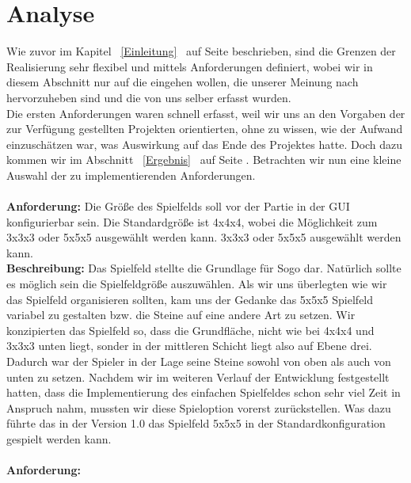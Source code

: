 \documentclass[a4paper]{scrartcl}
\begin{document}
\section{Analyse}\label{Analyse}

Wie zuvor im Kapitel ~\ref{Einleitung} \glqq{}\grqq \ auf Seite \pageref{Einleitung} beschrieben, sind die Grenzen der Realisierung sehr flexibel und mittels Anforderungen definiert, wobei wir in diesem Abschnitt nur auf die eingehen wollen, die unserer Meinung nach hervorzuheben sind und die von uns selber erfasst wurden.
\\
Die ersten Anforderungen waren schnell erfasst, weil wir uns an den Vorgaben der zur Verfügung gestellten Projekten orientierten, ohne zu wissen, wie der Aufwand einzuschätzen war, was Auswirkung auf das Ende des Projektes hatte. Doch dazu kommen wir im Abschnitt ~\ref{Ergebnis} \glqq{}\grqq \ auf Seite \pageref{Ergebnis}. Betrachten wir nun eine kleine Auswahl der zu implementierenden Anforderungen. 
\\
\\
\textbf{Anforderung:} 
Die Größe des Spielfelds soll vor der Partie in der GUI konfigurierbar sein. Die Standardgröße ist 4x4x4, wobei die Möglichkeit zum 3x3x3 oder 5x5x5 ausgewählt werden kann. 3x3x3 oder 5x5x5 ausgewählt werden kann.
\\
\textbf{Beschreibung:} Das Spielfeld stellte die Grundlage für Sogo dar. Natürlich sollte es möglich sein die Spielfeldgröße auszuwählen. Als wir uns überlegten wie wir das Spielfeld organisieren sollten, kam uns der Gedanke das 5x5x5 Spielfeld variabel zu gestalten bzw. die Steine auf eine andere Art zu setzen. Wir konzipierten das Spielfeld so, dass die Grundfläche, nicht wie bei 4x4x4 und 3x3x3 unten liegt, sonder in der mittleren Schicht liegt also auf Ebene drei.  Dadurch war der Spieler in der Lage seine Steine sowohl von oben als auch von unten zu setzen. Nachdem wir im weiteren Verlauf der Entwicklung festgestellt hatten, dass die Implementierung des einfachen Spielfeldes schon sehr viel Zeit in Anspruch nahm, mussten wir diese Spieloption vorerst zurückstellen. Was dazu führte das in der Version 1.0 das Spielfeld 5x5x5 in der Standardkonfiguration gespielt werden kann.
\\ 
\\
\textbf{Anforderung:} 
\end{document}
